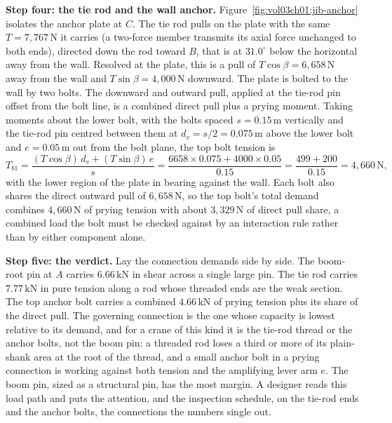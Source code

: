

\textbf{Step four: the tie rod and the wall anchor.}
Figure~\ref{fig:vol03ch01:jib-anchor} isolates the anchor plate at $C$.
The tie rod pulls on the plate with the same $T = 7{,}767\,\text{N}$ it
carries (a two-force member transmits its axial force unchanged to both
ends), directed down the rod toward $B$, that is at $31.0^{\circ}$ below
the horizontal away from the wall. Resolved at the plate, this is a pull
of $T\cos\beta = 6{,}658\,\text{N}$ away from the wall and $T\sin\beta =
4{,}000\,\text{N}$ downward. The plate is bolted to the wall by two bolts.
The downward and outward pull, applied at the tie-rod pin offset from the
bolt line, is a combined direct pull plus a prying moment. Taking moments
about the lower bolt, with the bolts spaced $s = 0.15\,\si{\meter}$
vertically and the tie-rod pin centred between them at $d_v = s/2 = 0.075\,
\si{\meter}$ above the lower bolt and $e = 0.05\,\si{\meter}$ out from the
bolt plane, the top bolt tension is
\[
T_{b1} = \frac{(T\cos\beta)\,d_v + (T\sin\beta)\,e}{s}
= \frac{6658 \times 0.075 + 4000 \times 0.05}{0.15}
= \frac{499 + 200}{0.15} = 4{,}660\,\text{N},
\]
with the lower region of the plate in bearing against the wall. Each bolt
also shares the direct outward pull of $6{,}658\,\text{N}$, so the top
bolt's total demand combines $4{,}660\,\text{N}$ of prying tension with
about $3{,}329\,\text{N}$ of direct pull share, a combined load the bolt
must be checked against by an interaction rule rather than by either
component alone.

\textbf{Step five: the verdict.} Lay the connection demands side by side.
The boom-root pin at $A$ carries $6.66\,\text{kN}$ in shear across a single
large pin. The tie rod carries $7.77\,\text{kN}$ in pure tension along a
rod whose threaded ends are the weak section. The top anchor bolt carries
a combined $4.66\,\text{kN}$ of prying tension plus its share of the
direct pull. The governing connection is the one whose capacity is lowest
relative to its demand, and for a crane of this kind it is the tie-rod
thread or the anchor bolts, not the boom pin: a threaded rod loses a third
or more of its plain-shank area at the root of the thread, and a small
anchor bolt in a prying connection is working against both tension and the
amplifying lever arm $e$. The boom pin, sized as a structural pin, has the
most margin. A designer reads this load path and puts the attention, and
the inspection schedule, on the tie-rod ends and the anchor bolts, the
connections the numbers single out.

